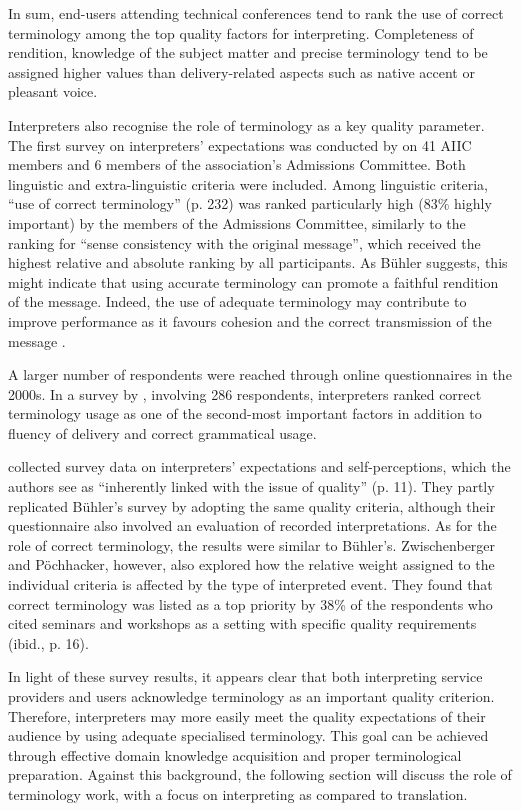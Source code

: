 In sum, end-users attending technical conferences tend to rank the use of correct terminology among the top quality factors for interpreting. Completeness of rendition, knowledge of the subject matter and precise terminology tend to be assigned higher values than delivery-related aspects such as native accent or pleasant voice.

Interpreters also recognise the role of terminology as a key quality parameter. The first survey on interpreters' expectations was conducted by \citet{buhler_linguistic_1986} on 41 AIIC members and 6 members of the association's Admissions Committee. Both linguistic and extra-linguistic criteria were included. Among linguistic criteria, ``use of correct terminology'' (p. 232) was ranked particularly high (83\% highly important) by the members of the Admissions Committee, similarly to the ranking for ``sense consistency with the original message'', which received the highest relative and absolute ranking by all participants. As Bühler suggests, this might indicate that using accurate terminology can promote a faithful rendition of the message. Indeed, the use of adequate terminology may contribute to improve performance as it favours cohesion and the correct transmission of the message \citep[219]{garcia2011terminologie}.

A larger number of respondents were reached through online questionnaires in the 2000s. In a survey by \citet{chiaro_interpreters_2004}, involving 286 respondents, interpreters ranked correct terminology usage as one of the second-most important factors in addition to fluency of delivery and correct grammatical usage.

\citet{pochhacker2010survey} collected survey data on interpreters' expectations and self-perceptions, which the authors see as ``inherently linked with the issue of quality'' (p. 11). They partly replicated Bühler's survey by adopting the same quality criteria, although their questionnaire also involved an evaluation of recorded interpretations. As for the role of correct terminology, the results were similar to Bühler's. Zwischenberger and Pöchhacker, however, also explored how the relative weight assigned to the individual criteria is affected by the type of interpreted event. They found that correct terminology was listed as a top priority by 38\% of the respondents who cited seminars and workshops as a setting with specific quality requirements (ibid., p. 16).

In light of these survey results, it appears clear that both interpreting service providers and users acknowledge terminology as an important quality criterion. Therefore, interpreters may more easily meet the quality expectations of their audience by using adequate specialised terminology. This goal can be achieved through effective domain knowledge acquisition and proper terminological preparation. Against this background, the following section will discuss the role of terminology work, with a focus on interpreting as compared to translation.

